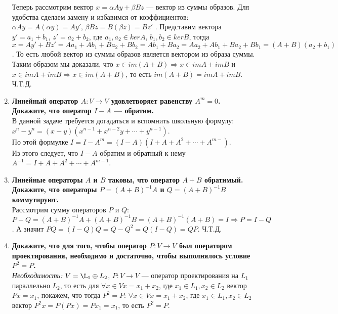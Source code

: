 \documentclass[12pt]{article} %
\begin{document}
\begin{enumerate}
    Теперь рассмотрим вектор $x = \alpha Ay + \beta Bz$ --- вектор из суммы образов. Для удобства сделаем замену и избавимся от коэффициентов: $\alpha Ay = A(\alpha y) = Ay'$, $\beta B z = B(\beta z) = Bz'$ . Представим вектора $y' = a_1 + b_1$, $z' = a_2 + b_2$, где $a_1, a_2 \in kerA$, $b_1, b_2 \in kerB$, тогда $x = Ay' + Bz' = Aa_1 + Ab_1 + Ba_2 + Bb_2 = Ab_1 + Ba_2 = Aa_2 + Ab_1 + Ba_2 + Bb_1 = (A + B)(a_2 + b_1)$. То есть любой вектор из суммы образов является вектором из образа суммы.\\

    Таким образом мы доказали, что $x \in im(A +B) \Rightarrow x \in imA + imB$ и $x \in imA + imB \Rightarrow x \in im(A +B)$, то есть $im(A + B) = imA + imB$. Ч.Т.Д.
    
    \item \textbf{Линейный оператор $A: V \rightarrow V$ удовлетворяет равенству $A^m = 0$. Докажите, что оператор $I - A$ --- обратим.}\\

    В данной задаче требуется догадаться и вспомнить школьную формулу: $x^n - y^n = (x - y)(x^{n - 1} + x^{n - 2}y + \cdots + y^{n - 1})$.\\
    По этой формулке $I = I - A^m = (I - A)(I + A + A^2 + \cdots + A^{m - })$.\\
    Из этого следует, что $I - A$ обратим и обратный к нему  $A^{-1} = I + A + A^2 + \cdots + A^{m - 1}$.\\
    
    \item \textbf{Линейные операторы $A$ и $B$ таковы, что оператор $A + B$ обратимый. Докажите, что операторы $P = (A + B)^{-1}A$ и $Q = (A + B)^{-1}B$ коммутируют.}\\

    Рассмотрим сумму операторов $P$ и $Q$: $P + Q = (A + B)^{-1}A + (A + B)^{-1}B = (A + B)^{-1}(A + B) = I \Rightarrow P = I - Q$. А значит $PQ = (I - Q)Q = Q - Q^2 = Q(I - Q) = QP$. Ч.Т.Д.\\
    
    \item \textbf{Докажите, что для того, чтобы оператор $P: V \rightarrow V$ был оператором проектирования, необходимо и достаточно, чтобы выполнялось условие $P^2 = P$.}\\

    \textit{Необходимость:} $V = \L_1 \oplus L_2$, $P : V \rightarrow V$ --- оператор проектирования на $L_1$ параллельно $L_2$, то есть для $\forall x \in V x = x_1 + x_2$, где $x_1 \in L_1, x_2 \in L_2$ вектор $Px = x_1$, покажем, что тогда $P^2 = P$: $\forall x \in V x = x_1 + x_2$, где $x_1 \in L_1, x_2 \in L_2$ вектор $P^2x = P(Px) = Px_1 = x_1$, то есть $P^2 = P$.\\


\end{enumerate}
\end{document}
